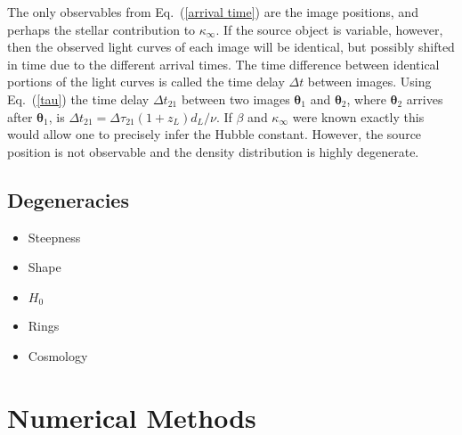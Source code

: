 \documentclass[galley]{mn2e}
\newcommand{\eqnref}[1] {Eq.~(\ref{#1})}
\renewcommand{\vec}[1]{\ensuremath{\boldsymbol{#1}}}
\begin{document}
The only observables from \eqnref{arrival time} are the image positions, and
perhaps the stellar contribution to $\kappa_\infty$.  If the source object is
variable, however, then the observed light curves of each image will be
identical, but possibly shifted in time due to the different arrival times.
The time difference between identical portions of the light curves is called
the time delay $\Delta t$ between images.  Using \eqnref{tau} the time delay
$\Delta t_{21}$ between two images $\vec\theta_1$ and $\vec\theta_2$, where $\vec\theta_2$
arrives after $\vec\theta_1$, is $\Delta t_{21} = \Delta \tau_{21}(1+z_L)d_L /
\nu$. If $\beta$ and $\kappa_\infty$ were known exactly this would allow one
to precisely infer the Hubble constant. However, the source position is not
observable and the density distribution is highly degenerate.

\subsection{Degeneracies} %

\begin{itemize}
  \item Steepness
  \item Shape
  \item $H_0$
  \item Rings
  \item Cosmology
\end{itemize}

%
%
%

\section{Numerical Methods}\label{sec:glass}
\end{document}
